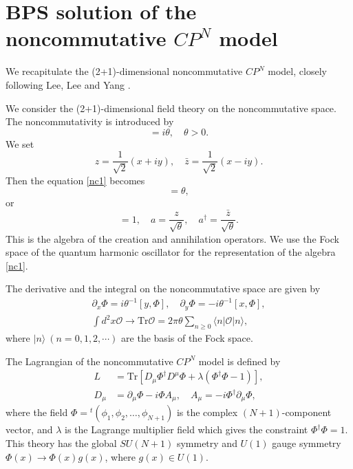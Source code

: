\documentclass[a4paper,12pt]{article}
\begin{document}
\section{BPS solution of the noncommutative $CP^N$ model}
We recapitulate the (2+1)-dimensional noncommutative $CP^N$ model, closely
following Lee, Lee and Yang \cite{LLY}.

We consider the (2+1)-dimensional field theory on the noncommutative space.
The noncommutativity is introduced by
\begin{equation}
[x,y]=i\theta, \quad \theta>0. \label{nc1}
\end{equation}
We set
\begin{equation}
z=\frac{1}{\sqrt{2}}(x+iy),\quad \bar{z}=\frac{1}{\sqrt{2}}(x-iy).\label{z}
\end{equation}
Then the equation \eqref{nc1} becomes
\begin{equation}
[z,\bar{z}]=\theta,\label{nc2}
\end{equation}
or
\begin{equation}
[a,a^\dag]=1,\quad a=\frac{z}{\sqrt{\theta}},\quad a^\dag=\frac{\bar{z}}{\sqrt{\theta}}.
\end{equation}
This is the algebra of the creation and annihilation operators. We use the Fock space of 
the quantum harmonic oscillator for the representation of the algebra \eqref{nc1}.

The derivative and the integral on the noncommutative space are given by
\begin{gather}
\partial_x\Phi=i\theta^{-1}[y,\Phi],\quad \partial_y\Phi=-i\theta^{-1}[x,\Phi],\\
\int d^2 x\mathcal{O}\rightarrow\mbox{Tr}\mathcal{O}=2\pi\theta\sum_{n\ge 0}\langle n|\mathcal{O}|n\rangle,
\end{gather}
where $|n\rangle\ (n=0,1,2,\cdots)$ are the basis of the Fock space.

The Lagrangian of the noncommutative $CP^N$ model \cite{LLY} is defined by 
\begin{align}
L&=\mbox{Tr}[D_\mu\Phi^\dag D^\mu\Phi+\lambda(\Phi^\dag \Phi-1)],\label{L}\\
D_\mu&=\partial_\mu\Phi-i\Phi A_\mu, \quad A_\mu=-i\Phi^\dag\partial_\mu\Phi,
\end{align}
where the field $\Phi={}^{t}(\phi_1,\phi_2,\ldots,\phi_{N+1})$ is the complex 
$(N+1)$-component vector, and $\lambda$ is the Lagrange multiplier field which gives the constraint $\Phi^\dag \Phi=1$.
This theory has the global $SU(N+1)$ symmetry and $U(1)$ gauge symmetry $\Phi(x)\rightarrow \Phi(x)g(x)$, 
where $g(x)\in U(1)$.
\end{document}
